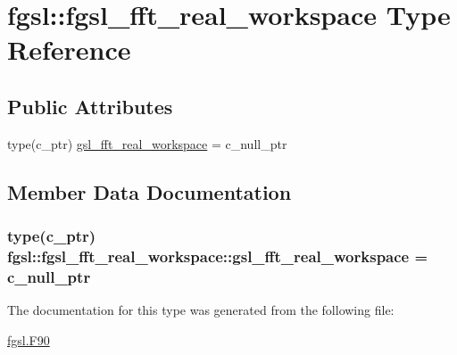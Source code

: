 \hypertarget{structfgsl_1_1fgsl__fft__real__workspace}{}\section{fgsl\+:\+:fgsl\+\_\+fft\+\_\+real\+\_\+workspace Type Reference}
\label{structfgsl_1_1fgsl__fft__real__workspace}
\subsection*{Public Attributes}
\begin{DoxyCompactItemize}
\item 
type(c\+\_\+ptr) \hyperlink{structfgsl_1_1fgsl__fft__real__workspace_aa9c3c1e2241ef0309eca81a637960ec4}{gsl\+\_\+fft\+\_\+real\+\_\+workspace} = c\+\_\+null\+\_\+ptr
\end{DoxyCompactItemize}


\subsection{Member Data Documentation}
\hypertarget{structfgsl_1_1fgsl__fft__real__workspace_aa9c3c1e2241ef0309eca81a637960ec4}{}
\subsubsection[{gsl\+\_\+fft\+\_\+real\+\_\+workspace}]{\setlength{\rightskip}{0pt plus 5cm}type(c\+\_\+ptr) fgsl\+::fgsl\+\_\+fft\+\_\+real\+\_\+workspace\+::gsl\+\_\+fft\+\_\+real\+\_\+workspace = c\+\_\+null\+\_\+ptr}\label{structfgsl_1_1fgsl__fft__real__workspace_aa9c3c1e2241ef0309eca81a637960ec4}


The documentation for this type was generated from the following file\+:\begin{DoxyCompactItemize}
\item 
\hyperlink{fgsl_8F90}{fgsl.\+F90}\end{DoxyCompactItemize}
